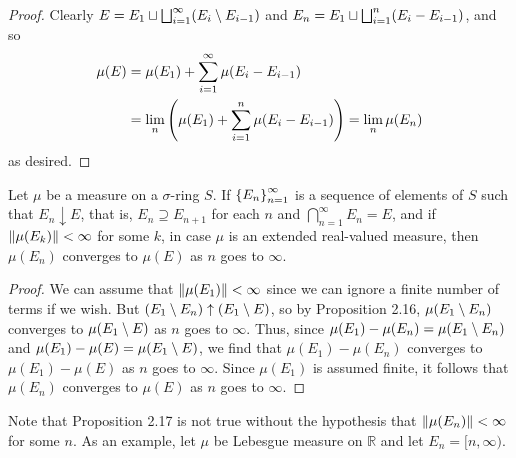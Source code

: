 \begin{proof}
Clearly $E=E_1\sqcup\bigsqcup_{i=1}^\infty(E_i\setminus E_{i-1})$ and $E_n=E_1\sqcup\bigsqcup_{i=1}^n(E_i-E_{i-1})$, and so
\begin{align*}
\mu(E)&=\mu(E_1) + \sum_{i=1}^\infty \mu(E_i-E_{i-1})\\
&=\lim_{n}\left(\mu(E_1)+\sum_{i=1}^n\mu(E_i-E_{i-1})\right)=\lim_n\mu(E_n)
\end{align*}
as desired.
\end{proof}

\begin{proposition}
Let $\mu$ be a measure on a $\sigma$-ring $S$. If $\left\{E_n\right\}_{n=1}^\infty$ is a sequence of elements of $S$ such that $E_n\downarrow E$, that is, $E_n \supseteq E_{n+1}$ for each $n$ and $\bigcap_{n=1}^\infty E_n=E$, and if $\norm{\mu(E_k)}<\infty$ for some $k$, in case $\mu$ is an extended real-valued measure, then $\mu(E_n)$ converges to $\mu(E)$ as $n$ goes to $\infty$.
\end{proposition}

\begin{proof}
We can assume that $\norm{\mu(E_1)}<\infty$ since we can ignore a finite number of terms if we wish. But $(E_1\setminus E_n)\uparrow(E_1\setminus E)$, so by Proposition 2.16, $\mu(E_1\setminus E_n)$ converges to $\mu(E_1\setminus E)$ as $n$ goes to $\infty$. Thus, since $\mu(E_1)-\mu(E_n)=\mu(E_1\setminus E_n)$ and $\mu(E_1)-\mu(E)=\mu(E_1\setminus E)$, we find that $\mu(E_1)-\mu(E_n)$ converges to $\mu(E_1)-\mu(E)$ as $n$ goes to $\infty$. Since $\mu(E_1)$ is assumed finite, it follows that $\mu(E_n)$ converges to $\mu(E)$ as $n$ goes to $\infty$.
\end{proof}

Note that Proposition 2.17 is not true without the hypothesis that $\norm{\mu(E_n)}<\infty$ for some $n$. As an example, let $\mu$ be Lebesgue measure on $\mathbb{R}$ and let $E_n=[n, \infty)$. 

